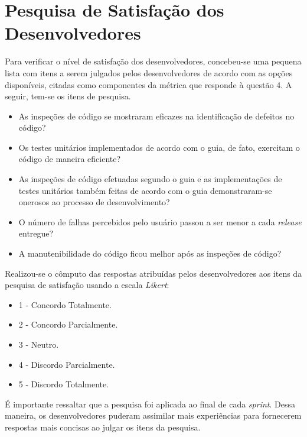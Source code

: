 \section{Pesquisa de Satisfação dos Desenvolvedores}

Para verificar o nível de satisfação dos desenvolvedores, concebeu-se uma pequena lista com itens a serem julgados pelos desenvolvedores de acordo com as opções disponíveis, citadas como componentes da métrica que responde à questão 4. A seguir, tem-se os itens de pesquisa.

\begin{itemize}
	\item As inspeções de código se mostraram eficazes na identificação de defeitos no código?

	\item Os testes unitários implementados de acordo com o guia, de fato, exercitam o código de maneira eficiente?

	\item As inspeções de código efetuadas segundo o guia e as implementações de testes unitários também feitas de acordo com o guia demonstraram-se onerosos ao processo de desenvolvimento?

	\item O número de falhas percebidos pelo usuário passou a ser menor a cada \textit{release} entregue?

	\item A manutenibilidade do código ficou melhor após as inspeções de código?
\end{itemize}

Realizou-se o cômputo das respostas atribuídas pelos desenvolvedores aos itens da pesquisa de satisfação usando a escala \textit{Likert}: 

\begin{itemize}
	\item {1 - Concordo Totalmente}.
	\item {2 - Concordo Parcialmente}.
	\item {3 - Neutro}.
	\item {4 - Discordo Parcialmente}.
	\item {5 - Discordo Totalmente}.
\end{itemize}

É importante ressaltar que a pesquisa foi aplicada ao final de cada \textit{sprint}. Dessa maneira, os desenvolvedores puderam assimilar mais experiências para fornecerem respostas mais concisas ao julgar os itens da pesquisa.

